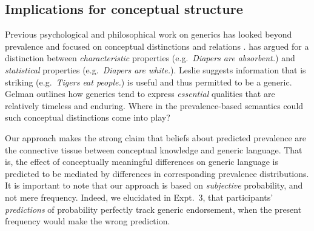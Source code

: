 \documentclass[12pt,letterpaper]{article}
\newcommand{\mht}[1]{\textcolor{Blue}{[mht: #1]}}
\begin{document}




\subsection*{Implications for conceptual structure}


Previous psychological and philosophical work on generics has looked beyond prevalence and focused on conceptual distinctions and relations \cite{Gelman2003,Prasada2013,Leslie2007,Leslie2008}. 
\citeauthor{Prasada2013} has argued for a distinction between \emph{characteristic} properties (e.g.~\emph{Diapers are absorbent.}) and \emph{statistical} properties (e.g.~\emph{Diapers are white.}).
Leslie suggests information that is striking (e.g.~\emph{Tigers eat people.}) is useful and thus permitted to be a generic.
Gelman outlines how generics tend to express \emph{essential} qualities that are relatively timeless and enduring. 
Where in the prevalence-based semantics could such conceptual distinctions come into play?

Our approach makes the strong claim that beliefs about predicted prevalence are the connective tissue between conceptual knowledge and generic language.
That is, the effect of conceptually meaningful differences on generic language is predicted to be mediated by differences in corresponding prevalence distributions.
It is important to note that our approach is based on \emph{subjective} probability, and not mere frequency.
Indeed, we elucidated in Expt.~3, that participants' \emph{predictions} of probability perfectly track generic endorsement, when the present frequency would make the wrong prediction.
\end{document}
